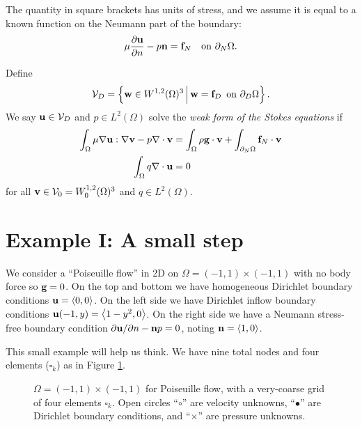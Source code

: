 The quantity in square brackets has units of stress, and we assume it is equal to a known function on the Neumann part of the boundary:
\begin{equation}
\mu \frac{\partial \mathbf{u}}{\partial n} - p \mathbf{n} = \mathbf{f}_N \quad \text{on } \partial_N \Omega.  \label{eq:ok:neumannbc}
\end{equation}

Define
\begin{equation}
\mathcal{V}_D = \left\{\mathbf{w} \in W^{1,2}(\Omega)^3 \,\Big|\, \mathbf{w} = \mathbf{f}_D \, \text{ on } \partial_D \Omega\right\}. \label{eq:ok:dirichletbc}
\end{equation}
We say $\mathbf{u} \in \mathcal{V}_D$ and $p \in L^2(\Omega)$ solve the \emph{weak form of the Stokes equations} if
\begin{align}
\int_\Omega \mu \nabla \mathbf{u} : \nabla \mathbf{v} - p \nabla\cdot \mathbf{v} &= \int_\Omega \rho \mathbf{g} \cdot \mathbf{v} + \int_{\partial_N \Omega} \mathbf{f}_N \cdot \mathbf{v} \label{eq:ok:weakstokesvelocity} \\
\int_\Omega q \nabla\cdot \mathbf{u} &= 0 \label{eq:ok:weakstokespressure}
\end{align}
for all $\mathbf{v} \in \mathcal{V}_0 = W_0^{1,2}(\Omega)^3$ and $q \in L^2(\Omega)$.


\section{Example I: A small step}

We consider a ``Poiseuille flow'' \citep{Elmanetal2005} in 2D on $\Omega=(-1,1)\times(-1,1)$ with no body force so $\mathbf{g}=0$.  On the top and bottom we have homogeneous Dirichlet boundary conditions $\mathbf{u}=\left<0,0\right>$.  On the left side we have Dirichlet inflow boundary conditions $\mathbf{u}(-1,y) = \left<1-y^2,0\right>$.  On the right side we have a Neumann stress-free boundary condition $\partial \mathbf{u}/\partial n - \mathbf{n} p = 0$, noting $\mathbf{n} = \left<1,0\right>$.

\newcommand{\one}{{\large \mathbb{1}}}

This small example will help us think.  We have nine total nodes and four elements ($\square_k$) as in Figure \ref{fig:ok:poiseuille}.

\begin{figure}

\caption{$\Omega=(-1,1)\times(-1,1)$ for Poiseuille flow, with a very-coarse grid of four elements $\square_k$.  Open circles ``{\large $\circ$}'' are velocity unknowns, ``$\bullet$'' are Dirichlet boundary conditions, and ``$\times$'' are pressure unknowns.}
\label{fig:ok:poiseuille}
\end{figure}

